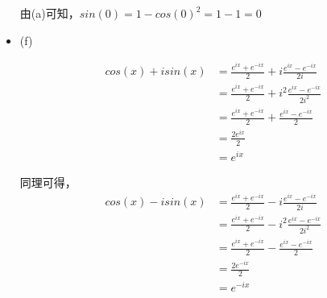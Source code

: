 \documentclass{article}
\begin{document}
\begin{itemize}
        由(a)可知，$sin(0) = 1 - cos(0)^2 = 1 - 1 = 0$


  \item (f)

        \begin{align*}
          cos(x) + isin(x) & = \frac{e^{ix} + e^{-ix}}{2} + i\frac{e^{ix} - e^{-ix}}{2i}     \\
                           & = \frac{e^{ix} + e^{-ix}}{2} + i^2\frac{e^{ix} - e^{-ix}}{2i^2} \\
                           & = \frac{e^{ix} + e^{-ix}}{2} + \frac{e^{ix} - e^{-ix}}{2}       \\
                           & = \frac{2e^{ix}}{2}                                             \\
                           & = e^{ix}
        \end{align*}

        同理可得，
        \begin{align*}
          cos(x) - isin(x) & = \frac{e^{ix} + e^{-ix}}{2} - i\frac{e^{ix} - e^{-ix}}{2i}     \\
                           & = \frac{e^{ix} + e^{-ix}}{2} - i^2\frac{e^{ix} - e^{-ix}}{2i^2} \\
                           & = \frac{e^{ix} + e^{-ix}}{2} - \frac{e^{ix} - e^{-ix}}{2}       \\
                           & = \frac{2e^{-ix}}{2}                                            \\
                           & = e^{-ix}
        \end{align*}

\end{itemize}
\end{document}
